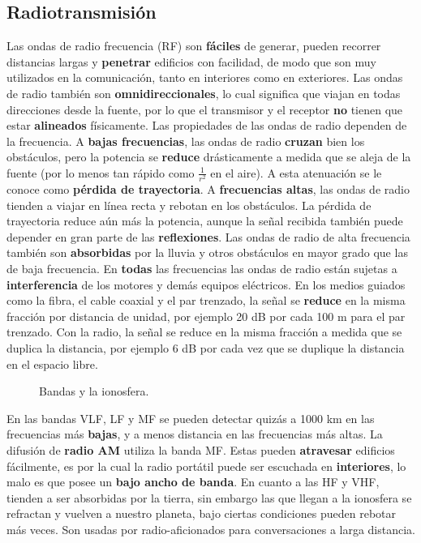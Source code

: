 \documentclass[
	12pt, %
	fleqn, %
	a4paper, %
	oneside, %
]{LegrandOrangeBook}
\begin{document}
\subsection{Radiotransmisión}
Las ondas de radio frecuencia (RF) son \textbf{fáciles} de generar, pueden recorrer distancias largas y \textbf{penetrar}
edificios con facilidad, de modo que son muy utilizados en la comunicación, tanto en interiores como en exteriores. Las ondas de radio también son \textbf{omnidireccionales}, lo cual significa que viajan en todas direcciones desde la fuente, por lo que el transmisor y el receptor \textbf{no} tienen que estar \textbf{alineados} físicamente. Las propiedades de las ondas de radio dependen de la frecuencia. A \textbf{bajas frecuencias}, las ondas de radio \textbf{cruzan} bien los obstáculos, pero la potencia se \textbf{reduce} drásticamente a medida que se aleja de la
fuente (por lo menos tan rápido como $\frac{1}{r^2}$ en el aire). A esta atenuación se le conoce como \textbf{pérdida de trayectoria}. A \textbf{frecuencias altas}, las ondas de radio tienden a viajar en línea recta y rebotan en los obstáculos. La pérdida de trayectoria reduce aún más la potencia, aunque la señal recibida también puede depender en gran parte de las \textbf{reflexiones}. Las ondas de radio de alta frecuencia también son \textbf{absorbidas} por la lluvia y otros obstáculos en mayor grado que las de baja frecuencia. En \textbf{todas} las frecuencias las ondas de radio están sujetas a \textbf{interferencia} de los motores y demás equipos eléctricos. En los medios guiados como la fibra, el cable coaxial y el par trenzado, la señal se \textbf{reduce} en la misma fracción por distancia de unidad, por ejemplo 20 dB por cada 100 m para el par trenzado. Con la radio, la señal se reduce en la misma fracción a medida que se duplica la distancia, por ejemplo 6 dB por cada vez que se duplique la distancia en el espacio libre.
\begin{figure}[H]
\centering
{}
\caption{Bandas y la ionosfera.}
\label{fig:tipos de repetidor}
\end{figure}
En las bandas VLF, LF y MF se pueden detectar quizás a 1000 km en las frecuencias más \textbf{bajas}, y a menos distancia en las frecuencias más altas. La difusión de \textbf{radio AM} utiliza la banda MF. Estas pueden \textbf{atravesar} edificios fácilmente, es por la cual la radio portátil puede ser escuchada en \textbf{interiores}, lo malo es que posee un \textbf{bajo ancho de banda}. En cuanto a las HF y VHF, tienden a ser absorbidas por la tierra, sin embargo las que llegan a la ionosfera se refractan y vuelven a nuestro planeta, bajo ciertas condiciones pueden rebotar más veces. Son usadas por radio-aficionados para conversaciones a larga distancia.
\end{document}
